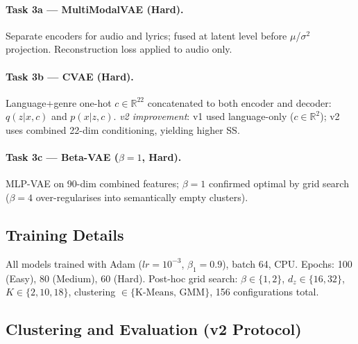 \documentclass{article}
\begin{document}
\paragraph{Task 3a --- MultiModalVAE (Hard).}
Separate encoders for audio and lyrics; fused at latent level before
$\mu$/$\sigma^2$ projection. Reconstruction loss applied to audio only.

\paragraph{Task 3b --- CVAE (Hard).}
Language+genre one-hot $c \in \mathbb{R}^{22}$ concatenated to both encoder and
decoder: $q(z|x,c)$ and $p(x|z,c)$. \textit{v2 improvement}: v1 used language-only
($c \in \mathbb{R}^{2}$); v2 uses combined 22-dim conditioning, yielding higher SS.

\paragraph{Task 3c --- Beta-VAE ($\beta\!=\!1$, Hard).}
MLP-VAE on 90-dim combined features; $\beta\!=\!1$ confirmed optimal by grid search
($\beta\!=\!4$ over-regularises into semantically empty clusters).

\subsection{Training Details}

All models trained with Adam ($lr\!=\!10^{-3}$, $\beta_1\!=\!0.9$), batch 64, CPU.
Epochs: 100 (Easy), 80 (Medium), 60 (Hard). Post-hoc grid search: $\beta\!\in\!\{1,2\}$,
$d_z\!\in\!\{16,32\}$, $K\!\in\!\{2,10,18\}$, clustering $\in\!\{\text{K-Means, GMM}\}$,
156 configurations total.

\subsection{Clustering and Evaluation (v2 Protocol)}
\end{document}
